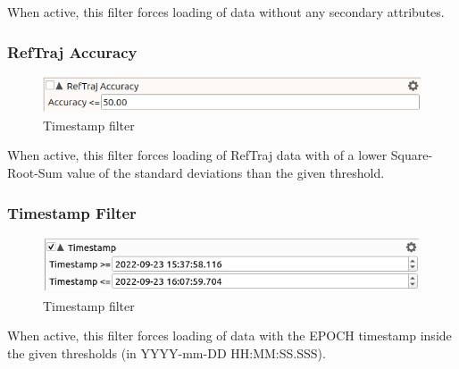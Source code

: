 When active, this filter forces loading of data without any secondary attributes.

\subsubsection{RefTraj Accuracy}

\begin{figure}[H]
  \center
    \includegraphics[width=12cm,frame]{figures/filter_reftrajacc.png}
  \caption{Timestamp filter}
\end{figure}

When active, this filter forces loading of RefTraj data with of a lower Square-Root-Sum value of the standard deviations than the given threshold.

\subsubsection{Timestamp Filter}

\begin{figure}[H]
  \center
    \includegraphics[width=12cm,frame]{figures/filter_timestamp.png}
  \caption{Timestamp filter}
\end{figure}

When active, this filter forces loading of data with the EPOCH timestamp inside the given thresholds (in YYYY-mm-DD HH:MM:SS.SSS).

% 
% 
% 
% 
